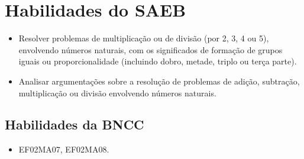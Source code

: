 \section*{Habilidades do SAEB}

\begin{itemize}
\item Resolver problemas de multiplicação ou de divisão (por 2, 3, 4 ou 5),
envolvendo números naturais, com os significados de formação de grupos
iguais ou proporcionalidade (incluindo dobro, metade, triplo ou terça
parte).

\item Analisar argumentações sobre a resolução de problemas de adição,
subtração, multiplicação ou divisão envolvendo números naturais.
\end{itemize}

\subsection{Habilidades da BNCC}

\begin{itemize}
	\item EF02MA07, EF02MA08.
\end{itemize}


